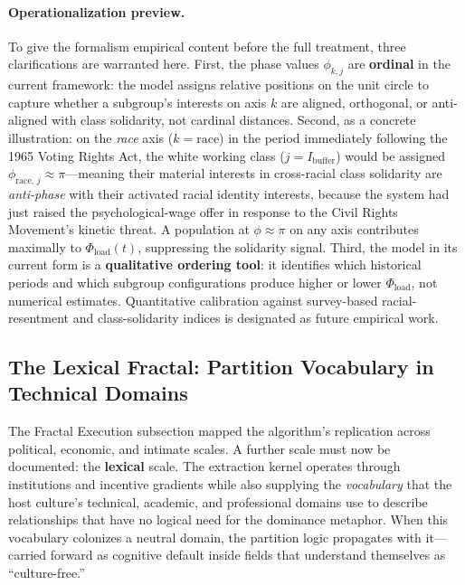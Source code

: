 \paragraph{Operationalization preview.}
To give the formalism empirical content before the full treatment, three clarifications are warranted here. First, the phase values $\phi_{k,j}$ are \textbf{ordinal} in the current framework: the model assigns relative positions on the unit circle to capture whether a subgroup's interests on axis $k$ are aligned, orthogonal, or anti-aligned with class solidarity, not cardinal distances. Second, as a concrete illustration: on the \textit{race} axis ($k = \text{race}$) in the period immediately following the 1965 Voting Rights Act, the white working class ($j = I_{\text{buffer}}$) would be assigned $\phi_{\text{race},\, j} \approx \pi$---meaning their material interests in cross-racial class solidarity are \textit{anti-phase} with their activated racial identity interests, because the system had just raised the psychological-wage offer in response to the Civil Rights Movement's kinetic threat. A population at $\phi \approx \pi$ on any axis contributes maximally to $\Phi_{\text{load}}(t)$, suppressing the solidarity signal. Third, the model in its current form is a \textbf{qualitative ordering tool}: it identifies which historical periods and which subgroup configurations produce higher or lower $\Phi_{\text{load}}$, not numerical estimates. Quantitative calibration against survey-based racial-resentment and class-solidarity indices is designated as future empirical work.

\subsection{The Lexical Fractal: Partition Vocabulary in Technical Domains}
\label{sec:lexical_fractal}

The Fractal Execution subsection mapped the algorithm's replication across political, economic, and intimate scales. A further scale must now be documented: the \textbf{lexical} scale. The extraction kernel operates through institutions and incentive gradients while also supplying the \textit{vocabulary} that the host culture's technical, academic, and professional domains use to describe relationships that have no logical need for the dominance metaphor. When this vocabulary colonizes a neutral domain, the partition logic propagates with it---carried forward as cognitive default inside fields that understand themselves as ``culture-free.''

